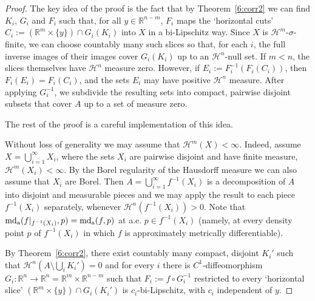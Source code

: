 \documentclass[12pt,leqno]{amsart}
\theoremstyle{definition}
\newcommand{\bbbr}{\mathbb R}
\def\H{{\mathcal H}}
\def\rank{{\rm rank\,}}
\def\md{\operatorname{md}}
\def\apmd{\operatorname{md_{\rm a}}}
\numberwithin{theorem}{section} \numberwithin{equation}{section}
\begin{document}
\begin{proof}
The key idea of the proof is the fact that by Theorem~\ref{6:corr2} we can find $K_i$, $G_i$ and $F_i$ such that, for all $y\in \bbbr^{n-m}$,  $F_i$ maps the `horizontal cuts' $C_i:=(\bbbr^m\times\{y\})\cap G_i(K_i)$ into $X$ in a bi-Lipschitz way. Since $X$ is $\H^m$-$\sigma$-finite, we can choose countably many such slices so that, for each $i$, the full inverse images of their images cover $G_i(K_i)$ up to an $\H^n$-null set. If $m<n$, the slices themselves have $\H^n$ measure zero. However, if $E_i:=F_i^{-1}(F_i(C_i))$, then $F_i(E_i)=F_i(C_i)$, and the sets $E_i$ may have positive $\H^n$ measure. After applying $G_i^{-1}$, we subdivide the resulting sets into compact, pairwise disjoint subsets that cover $A$ up to a set of measure zero.

The rest of the proof is a careful implementation of this idea.

Without loss of generality we may assume that $\mathcal{H}^m(X)<\infty$. Indeed, assume $X=\bigcup_{i=1}^\infty X_i$, where the sets $X_i$ are pairwise disjoint and have finite measure, $\mathcal{H}^m(X_i)<\infty$. By the Borel regularity of the Hausdorff measure we can also assume that $X_i$ are Borel. Then $A=\bigcup_{i=1}^\infty f^{-1}(X_i)$ is a decomposition of $A$ into disjoint and measurable pieces and we may apply the result to each piece $f^{-1}(X_i)$ separately, whenever $\H^n(f^{-1}(X_i))>0$. Note that $\apmd(f|_{f^{-1}(X_i)},p)=\apmd(f,p)$ at a.e. $p\in f^{-1}(X_i)$ (namely, at every density point $p$ of $f^{-1}(X_i)$ in which $f$ is approximately metrically differentiable).



By Theorem~\ref{6:corr2}, there exist countably many compact, disjoint $K_i'$ such that $\H^n(A\setminus \bigcup_i K_i')=0$ and for every $i$ there is $C^1$-diffeomorphism $G_i:\bbbr^n\to\bbbr^n=\bbbr^m\times \bbbr^{n-m}$  such that $F_i:=f\circ G_i^{-1}$ restricted to every `horizontal slice' $(\bbbr^m\times \{y\})\cap G_i(K_i')$ is $c_i$-bi-Lipschitz, with $c_i$ independent of $y$.


\end{proof}
\end{document}
